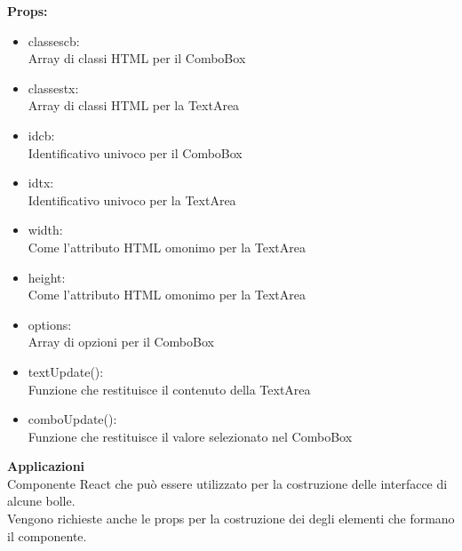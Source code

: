 \textbf{Props:} 
\begin{itemize}
\item classescb: 
\\
Array di classi HTML per il ComboBox
\item classestx: 
\\
Array di classi HTML per la TextArea
\item idcb: 
\\
Identificativo univoco per il ComboBox
\item idtx: 
\\
Identificativo univoco per la TextArea
\item width: 
\\
Come l'attributo HTML omonimo per la TextArea
\item height: 
\\
Come l'attributo HTML omonimo per la TextArea
\item options: 
\\
Array di opzioni per il ComboBox
\item textUpdate(): 
\\
Funzione che restituisce il contenuto della TextArea
\item comboUpdate():
\\
Funzione che restituisce il valore selezionato nel ComboBox



\end{itemize} 


\textbf{Applicazioni}\\
Componente React che può essere utilizzato per la costruzione delle interfacce di alcune bolle.
\\ Vengono richieste anche le props per la costruzione dei degli elementi che formano il componente. 


\clearpage


